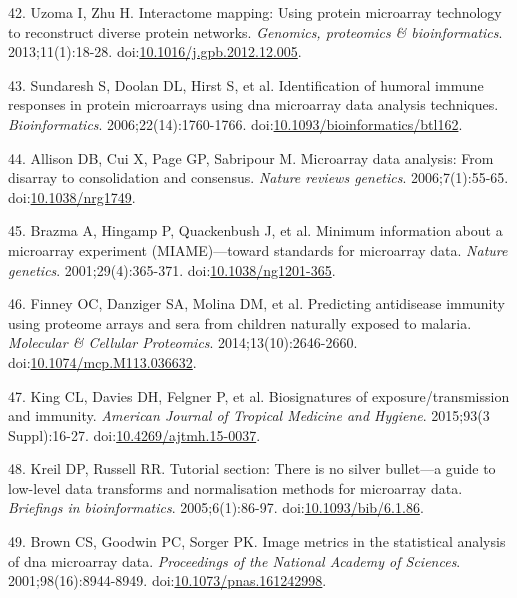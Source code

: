 \documentclass[a4paper]{article}
\begin{document}
\hypertarget{ref-uzoma2013interactome}{}
42. Uzoma I, Zhu H. Interactome mapping: Using protein microarray
technology to reconstruct diverse protein networks. \emph{Genomics,
proteomics \& bioinformatics}. 2013;11(1):18-28.
doi:\href{https://doi.org/10.1016/j.gpb.2012.12.005}{10.1016/j.gpb.2012.12.005}.

\hypertarget{ref-sundaresh2006}{}
43. Sundaresh S, Doolan DL, Hirst S, et al. Identification of humoral
immune responses in protein microarrays using dna microarray data
analysis techniques. \emph{Bioinformatics}. 2006;22(14):1760-1766.
doi:\href{https://doi.org/10.1093/bioinformatics/btl162}{10.1093/bioinformatics/btl162}.

\hypertarget{ref-allison2006}{}
44. Allison DB, Cui X, Page GP, Sabripour M. Microarray data analysis:
From disarray to consolidation and consensus. \emph{Nature reviews
genetics}. 2006;7(1):55-65.
doi:\href{https://doi.org/10.1038/nrg1749}{10.1038/nrg1749}.

\hypertarget{ref-brazma2001}{}
45. Brazma A, Hingamp P, Quackenbush J, et al. Minimum information about
a microarray experiment (MIAME)---toward standards for microarray data.
\emph{Nature genetics}. 2001;29(4):365-371.
doi:\href{https://doi.org/10.1038/ng1201-365}{10.1038/ng1201-365}.

\hypertarget{ref-Finney2014}{}
46. Finney OC, Danziger SA, Molina DM, et al. Predicting antidisease
immunity using proteome arrays and sera from children naturally exposed
to malaria. \emph{Molecular \& Cellular Proteomics}.
2014;13(10):2646-2660.
doi:\href{https://doi.org/10.1074/mcp.M113.036632}{10.1074/mcp.M113.036632}.

\hypertarget{ref-King2015FOC}{}
47. King CL, Davies DH, Felgner P, et al. Biosignatures of
exposure/transmission and immunity. \emph{American Journal of Tropical
Medicine and Hygiene}. 2015;93(3 Suppl):16-27.
doi:\href{https://doi.org/10.4269/ajtmh.15-0037}{10.4269/ajtmh.15-0037}.

\hypertarget{ref-kreil2005bullet}{}
48. Kreil DP, Russell RR. Tutorial section: There is no silver
bullet---a guide to low-level data transforms and normalisation methods
for microarray data. \emph{Briefings in bioinformatics}.
2005;6(1):86-97.
doi:\href{https://doi.org/10.1093/bib/6.1.86}{10.1093/bib/6.1.86}.

\hypertarget{ref-brown2001image}{}
49. Brown CS, Goodwin PC, Sorger PK. Image metrics in the statistical
analysis of dna microarray data. \emph{Proceedings of the National
Academy of Sciences}. 2001;98(16):8944-8949.
doi:\href{https://doi.org/10.1073/pnas.161242998}{10.1073/pnas.161242998}.
\end{document}
